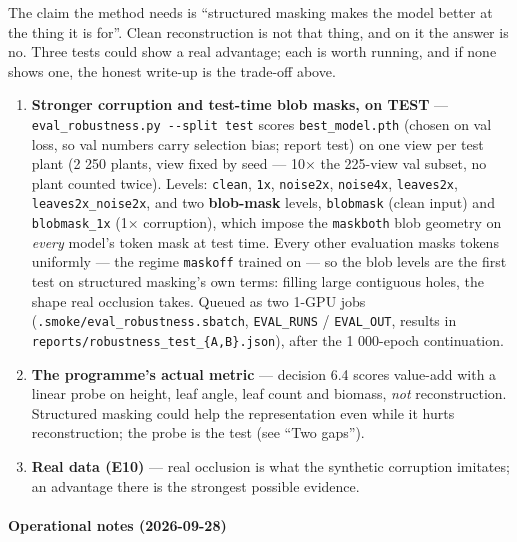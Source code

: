 \documentclass[
  10pt,
]{article}
\newcounter{none} %
\providecommand{\tightlist}{%
  \setlength{\itemsep}{0pt}\setlength{\parskip}{0pt}}
\begin{document}
The claim the method needs is ``structured masking makes the model
better at the thing it is for''. Clean reconstruction is not that thing,
and on it the answer is no. Three tests could show a real advantage;
each is worth running, and if none shows one, the honest write-up is the
trade-off above.

\begin{enumerate}
\def\labelenumi{\arabic{enumi}.}
\tightlist
\item
  \textbf{Stronger corruption and test-time blob masks, on TEST} ---
  \texttt{eval\_robustness.py\ -\/-split\ test} scores
  \texttt{best\_model.pth} (chosen on val loss, so val numbers carry
  selection bias; report test) on one view per test plant (2 250 plants,
  view fixed by seed --- 10× the 225-view val subset, no plant counted
  twice). Levels: \texttt{clean}, \texttt{1x}, \texttt{noise2x},
  \texttt{noise4x}, \texttt{leaves2x}, \texttt{leaves2x\_noise2x}, and
  two \textbf{blob-mask} levels, \texttt{blobmask} (clean input) and
  \texttt{blobmask\_1x} (1× corruption), which impose the
  \texttt{maskboth} blob geometry on \emph{every} model's token mask at
  test time. Every other evaluation masks tokens uniformly --- the
  regime \texttt{maskoff} trained on --- so the blob levels are the
  first test on structured masking's own terms: filling large contiguous
  holes, the shape real occlusion takes. Queued as two 1-GPU jobs
  (\texttt{.smoke/eval\_robustness.sbatch}, \texttt{EVAL\_RUNS} /
  \texttt{EVAL\_OUT}, results in
  \texttt{reports/robustness\_test\_\{A,B\}.json}), after the 1
  000-epoch continuation.
\item
  \textbf{The programme's actual metric} --- decision 6.4 scores
  value-add with a linear probe on height, leaf angle, leaf count and
  biomass, \emph{not} reconstruction. Structured masking could help the
  representation even while it hurts reconstruction; the probe is the
  test (see ``Two gaps'').
\item
  \textbf{Real data (E10)} --- real occlusion is what the synthetic
  corruption imitates; an advantage there is the strongest possible
  evidence.
\end{enumerate}

\paragraph{Operational notes
(2026-09-28)}\label{operational-notes-2026-09-28}
\end{document}
